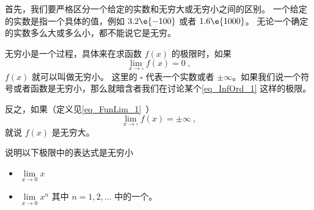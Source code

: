 

首先，我们要严格区分一个给定的实数和无穷大或无穷小之间的区别。 一个给定的实数是指一个具体的值，例如 $3.2\e{-100}$ 或者 $1.6\e{1000}$。 无论一个确定的实数多么大或多么小，都不能说它是无穷。

无穷小是一个过程，具体来在求函数 $f(x)$ 的极限时，如果
\begin{equation}\label{eq_InfOrd_1}
\lim_{x\to \square} f(x) = 0~,
\end{equation}
$f(x)$ 就可以叫做无穷小。 这里的 $\square$ 代表一个实数或者 $\pm\infty$。如果我们说一个符号或者函数是无穷小，那么就暗含者我们在讨论某个\autoref{eq_InfOrd_1} 这样的极限。

反之，如果（定义见\autoref{eq_FunLim_1}~）
\begin{equation}
\lim_{x\to \square} f(x) = \pm\infty~,
\end{equation}
就说 $f(x)$ 是无穷大。

\begin{exercise}{}
说明以下极限中的表达式是无穷小
\begin{itemize}
\item $\lim\limits_{x\to 0} x$
\item $\lim\limits_{x\to 0} x^n$ 其中 $n=1,2,\dots$ 中的一个。
\end{itemize}
\end{exercise}